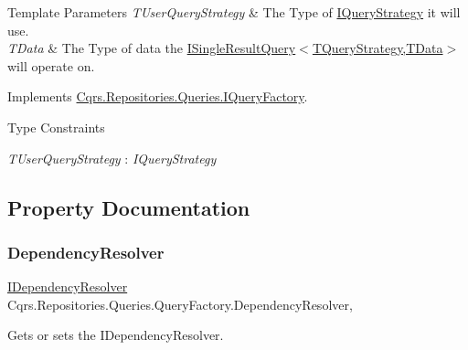 \begin{DoxyTemplParams}{Template Parameters}
{\em T\+User\+Query\+Strategy} & The Type of \hyperlink{interfaceCqrs_1_1Repositories_1_1Queries_1_1IQueryStrategy}{I\+Query\+Strategy} it will use.\\
\hline
{\em T\+Data} & The Type of data the \hyperlink{interfaceCqrs_1_1Repositories_1_1Queries_1_1ISingleResultQuery}{I\+Single\+Result\+Query$<$\+T\+Query\+Strategy,\+T\+Data$>$} will operate on.\\
\hline
\end{DoxyTemplParams}


Implements \hyperlink{interfaceCqrs_1_1Repositories_1_1Queries_1_1IQueryFactory_a237aee0f99d8bfc03d8f10595f16ecea_a237aee0f99d8bfc03d8f10595f16ecea}{Cqrs.\+Repositories.\+Queries.\+I\+Query\+Factory}.

\begin{Desc}
\item[Type Constraints]\begin{description}
\item[{\em T\+User\+Query\+Strategy} : {\em I\+Query\+Strategy}]\end{description}
\end{Desc}


\subsection{Property Documentation}
\mbox{\label{classCqrs_1_1Repositories_1_1Queries_1_1QueryFactory_a550e1e11b126247c5adebdd384000252_a550e1e11b126247c5adebdd384000252}} 
\subsubsection{\texorpdfstring{Dependency\+Resolver}{DependencyResolver}}
{\footnotesize\ttfamily \hyperlink{interfaceCqrs_1_1Configuration_1_1IDependencyResolver}{I\+Dependency\+Resolver} Cqrs.\+Repositories.\+Queries.\+Query\+Factory.\+Dependency\+Resolver\hspace{0.3cm}{\ttfamily [get]}, {\ttfamily [protected]}}



Gets or sets the I\+Dependency\+Resolver. 

